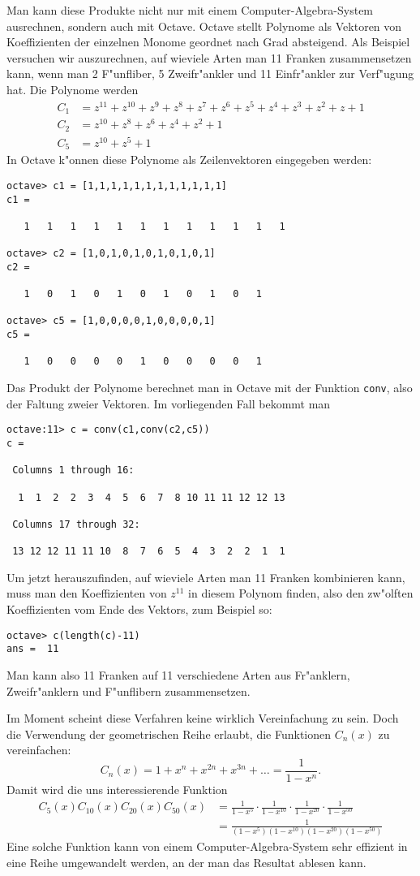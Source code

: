 Man kann diese Produkte nicht nur mit einem Computer-Algebra-System
ausrechnen, sondern auch mit Octave. Octave stellt Polynome als
Vektoren von Koeffizienten der einzelnen Monome geordnet nach Grad
absteigend. Als Beispiel versuchen wir auszurechnen, auf wieviele
Arten man 11 Franken zusammensetzen kann, wenn man 2 F"unfliber,
5 Zweifr"ankler und 11 Einfr"ankler zur Verf"ugung hat. Die
Polynome werden
\begin{align*}
C_1&=z^{11}+z^{10}+z^9+z^8+z^7+z^6+z^5+z^4+z^3+z^2+z+1\\
C_2&=z^{10}+z^8+z^6+z^4+z^2+1\\
C_5&=z^{10}+z^5+1
\end{align*}
In Octave k"onnen diese Polynome als Zeilenvektoren eingegeben werden:
\begin{verbatim}
octave> c1 = [1,1,1,1,1,1,1,1,1,1,1,1]
c1 =

   1   1   1   1   1   1   1   1   1   1   1   1

octave> c2 = [1,0,1,0,1,0,1,0,1,0,1]
c2 =

   1   0   1   0   1   0   1   0   1   0   1

octave> c5 = [1,0,0,0,0,1,0,0,0,0,1]
c5 =

   1   0   0   0   0   1   0   0   0   0   1
\end{verbatim}
Das Produkt der Polynome berechnet man in Octave mit der Funktion
{\tt conv}, also der Faltung zweier Vektoren. Im vorliegenden Fall
bekommt man
\begin{verbatim}
octave:11> c = conv(c1,conv(c2,c5))
c =

 Columns 1 through 16:

  1  1  2  2  3  4  5  6  7  8 10 11 11 12 12 13

 Columns 17 through 32:

 13 12 12 11 11 10  8  7  6  5  4  3  2  2  1  1
\end{verbatim}
Um jetzt herauszufinden, auf wieviele Arten man 11 Franken
kombinieren kann, muss man den Koeffizienten von $z^{11}$ in diesem
Polynom finden, also den zw"olften Koeffizienten vom Ende des
Vektors, zum Beispiel so:
\begin{verbatim}
octave> c(length(c)-11)
ans =  11
\end{verbatim}
Man kann also 11 Franken auf 11 verschiedene Arten aus Fr"anklern,
Zweifr"anklern und F"unflibern zusammensetzen.

Im Moment scheint diese Verfahren keine wirklich Vereinfachung
zu sein. Doch die Verwendung der geometrischen Reihe erlaubt, die
Funktionen $C_n(x)$ zu vereinfachen:
\[
C_n(x)=1+x^n+x^{2n}+x^{3n}+\dots = \frac1{1-x^n}.
\]
Damit wird die uns interessierende Funktion
\begin{align*}
C_5(x) C_{10}(x) C_{20}(x) C_{50}(x)
&=
\frac1{1-x^5}\cdot
\frac1{1-x^{10}}\cdot
\frac1{1-x^{20}}\cdot
\frac1{1-x^{50}}
\\
&=
\frac1{
(1-x^5)
(1-x^{10})
(1-x^{20})
(1-x^{50})
}
\end{align*}
Eine solche Funktion kann von einem Computer-Algebra-System sehr effizient
in eine Reihe umgewandelt werden, an der man das Resultat ablesen kann.

